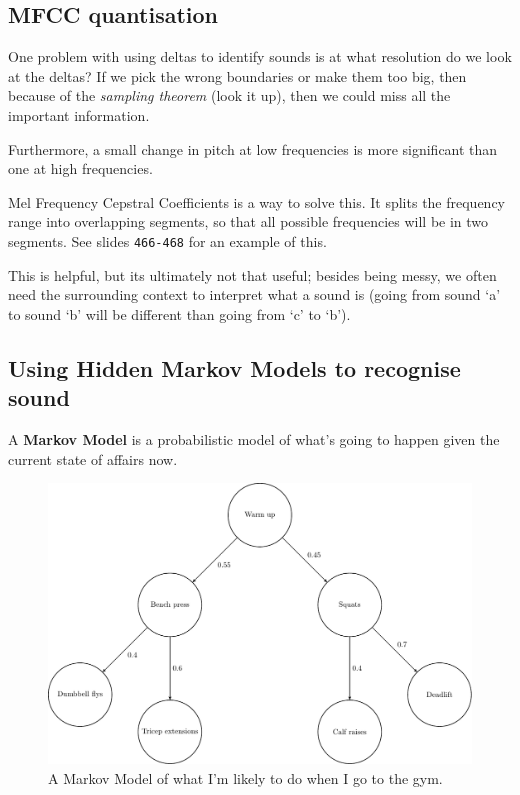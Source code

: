 \subsection{MFCC quantisation}

One problem with using deltas to identify sounds is at what resolution do we
look at the deltas? If we pick the wrong boundaries or make them too big, then
because of the \textit{sampling theorem} (look it up), then we could miss all
the important information.

Furthermore, a small change in pitch at low frequencies is more significant than
one at high frequencies.

Mel Frequency Cepstral Coefficients is a way to solve this. It splits the
frequency range into overlapping segments, so that all possible frequencies will
be in two segments. See slides \texttt{466-468} for an example of this.

This is helpful, but its ultimately not that useful; besides being messy, we
often need the surrounding context to interpret what a sound is (going from
sound `a' to sound `b' will be different than going from `c' to `b').

\subsection{Using Hidden Markov Models to recognise sound}

A \textbf{Markov Model} is a probabilistic model of what's going to happen given
the current state of affairs now.

\begin{figure}[h]
  \includegraphics[width=\textwidth]{diagrams/markov-model}
  \caption{A Markov Model of what I'm likely to do when I go to the gym.}
  \label{fig:gym-model}
\end{figure}

